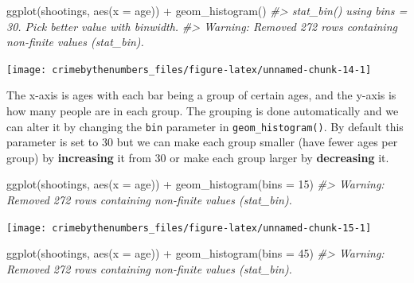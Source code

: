\documentclass[
  12pt,
]{book}
\newenvironment{Shaded}{\begin{snugshade}}{\end{snugshade}}
\newcommand{\AttributeTok}[1]{\textcolor[rgb]{0.61,0.61,0.61}{#1}}
\newcommand{\CommentTok}[1]{\textcolor[rgb]{0.37,0.37,0.37}{\textit{#1}}}
\newcommand{\DecValTok}[1]{\textcolor[rgb]{0.06,0.06,0.06}{#1}}
\newcommand{\FunctionTok}[1]{\textcolor[rgb]{0,0,0}{#1}}
\newcommand{\NormalTok}[1]{#1}
\newcommand{\SpecialCharTok}[1]{\textcolor[rgb]{0,0,0}{#1}}
\begin{document}
\begin{Shaded}
\begin{Highlighting}[]
\FunctionTok{ggplot}\NormalTok{(shootings, }\FunctionTok{aes}\NormalTok{(}\AttributeTok{x =}\NormalTok{ age)) }\SpecialCharTok{+} 
  \FunctionTok{geom\_histogram}\NormalTok{()}
\CommentTok{\#\textgreater{} \textasciigrave{}stat\_bin()\textasciigrave{} using \textasciigrave{}bins = 30\textasciigrave{}. Pick better value with \textasciigrave{}binwidth\textasciigrave{}.}
\CommentTok{\#\textgreater{} Warning: Removed 272 rows containing non{-}finite values (stat\_bin).}
\end{Highlighting}
\end{Shaded}

\begin{center}\texttt{[image: crimebythenumbers\_files/figure-latex/unnamed-chunk-14-1]} \end{center}

The x-axis is ages with each bar being a group of certain ages, and the y-axis is how many people are in each group. The grouping is done automatically and we can alter it by changing the \texttt{bin} parameter in \texttt{geom\_histogram()}. By default this parameter is set to 30 but we can make each group smaller (have fewer ages per group) by \textbf{increasing} it from 30 or make each group larger by \textbf{decreasing} it.

\begin{Shaded}
\begin{Highlighting}[]
\FunctionTok{ggplot}\NormalTok{(shootings, }\FunctionTok{aes}\NormalTok{(}\AttributeTok{x =}\NormalTok{ age)) }\SpecialCharTok{+} 
  \FunctionTok{geom\_histogram}\NormalTok{(}\AttributeTok{bins =} \DecValTok{15}\NormalTok{)}
\CommentTok{\#\textgreater{} Warning: Removed 272 rows containing non{-}finite values (stat\_bin).}
\end{Highlighting}
\end{Shaded}

\begin{center}\texttt{[image: crimebythenumbers\_files/figure-latex/unnamed-chunk-15-1]} \end{center}

\begin{Shaded}
\begin{Highlighting}[]
\FunctionTok{ggplot}\NormalTok{(shootings, }\FunctionTok{aes}\NormalTok{(}\AttributeTok{x =}\NormalTok{ age)) }\SpecialCharTok{+} 
  \FunctionTok{geom\_histogram}\NormalTok{(}\AttributeTok{bins =} \DecValTok{45}\NormalTok{)}
\CommentTok{\#\textgreater{} Warning: Removed 272 rows containing non{-}finite values (stat\_bin).}
\end{Highlighting}
\end{Shaded}
\end{document}
